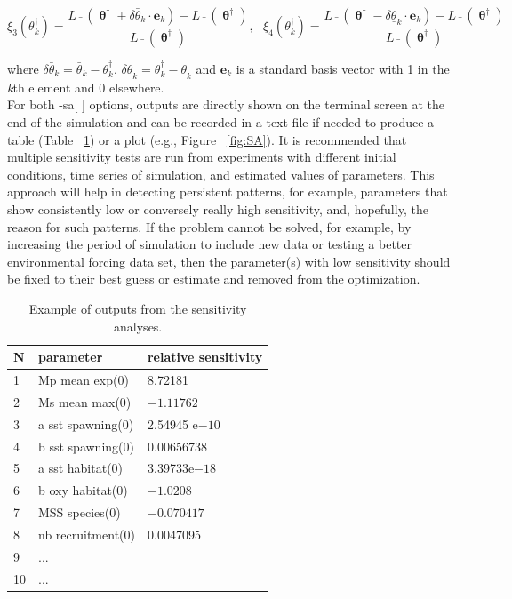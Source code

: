 \begin{equation}
 \xi_3(\theta^{\dag}_k)=\frac{L\bar{\text{ }}(\boldsymbol \uptheta^{\dag}+\delta \bar{\theta}_k \cdot \mathbf{e}_k)-L\bar{\text{ }}(\boldsymbol \uptheta^{\dag})}{L\bar{\text{ }}(\boldsymbol \uptheta^{\dag})}, \text{ }
  \xi_4(\theta^{\dag}_k)=\frac{L\bar{\text{ }}(\boldsymbol \uptheta^{\dag}-\delta \underline{\theta}_k \cdot \mathbf{e}_k)-L\bar{\text{ }}(\boldsymbol \uptheta^{\dag})}{L\bar{\text{ }}(\boldsymbol \uptheta^{\dag})}
\end{equation}

\noindent where $\delta \bar{\theta}_k=\bar\theta_k-\theta^{\dag}_k$, $\delta \underline{\theta}_k=\theta^{\dag}_k-\underline\theta_k$ and $\mathbf{e}_k$ is a standard basis vector with 1 in the \textit{k}th  element and 0 elsewhere. \\


\noindent For both -sa[ ] options, outputs are directly shown on the terminal screen at the end of the simulation and can be recorded in a text file if needed to produce a table (Table ~\ref{table:SA}) or a plot (e.g., Figure ~\ref{fig:SA}). It is recommended that multiple sensitivity tests are run from experiments with different initial conditions, time series of simulation, and estimated values of parameters. This approach will help in detecting persistent patterns, for example, parameters that show consistently low or conversely really high sensitivity, and, hopefully, the reason for such patterns. If the problem cannot be solved, for example, by increasing the period of simulation to include new data or testing a better environmental forcing data set, then the parameter(s) with low sensitivity should be fixed to their best guess or estimate and removed from the optimization.\\


\begin{table}[tbp]
	\centering
		\caption{Example of outputs from the sensitivity analyses.}
		\vspace{0.5cm}
\begin{tabular}{lll}
 N& parameter & relative sensitivity \\
\hline
1& Mp mean exp(0)    & 8.72181      \\
2& Ms mean max(0) 	 & $-1.11762$     \\
3& a sst spawning(0) & 2.54945 e$-10$ \\
4& b sst spawning(0) & 0.00656738   \\
5& a sst habitat(0)  & 3.39733e$-18$  \\
6& b oxy habitat(0)	 & $-1.0208$      \\
7& MSS species(0)    & $-0.070417$    \\
8& nb recruitment(0) & 0.0047095    \\
9& ...	\\
10&...  \\
\hline
\end{tabular}
\label{table:SA}
\end{table}

